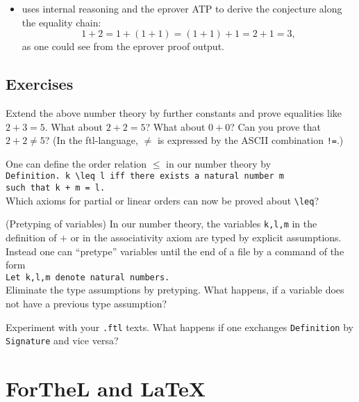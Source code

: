 \documentclass[11pt]{article}
\begin{document}
\begin{itemize}
\item \Naproche{} uses internal reasoning and the eprover ATP to
derive the conjecture
along the equality chain:
$$1 + 2 = 1 + (1 + 1) = (1 + 1) + 1 = 2 + 1 = 3,$$
as one could see from the eprover proof output.
\end{itemize}

\subsection{Exercises}

\begin{exercise}
Extend the above number theory by further constants and prove
equalities like $2 + 3 = 5$. What about $2 + 2 = 5$? What about
$0+0$? Can
you prove that $2 + 2 \neq 5$? (In the ftl-language, $\neq$ is expressed
by the ASCII combination \verb+!=+.)
\end{exercise}

\begin{exercise}
One can define the order relation $\leq$ in our number theory
by\\
\verb/Definition. k \leq l iff there exists a natural number m/\\
\verb/such that k + m = l./\\
Which axioms for partial or linear orders can now be proved about
\verb+\leq+?
\end{exercise}

\begin{exercise} (Pretyping of variables) In our number theory,
the variables \verb+k,l,m+ in the definition of $+$ or in the
associativity axiom are typed by explicit assumptions. Instead one
can ``pretype'' variables until the end of a file by a command of
the form\\
\verb+Let k,l,m denote natural numbers.+\\
Eliminate the type assumptions by pretyping.
What happens, if a variable does not have a previous
type assumption?
\end{exercise}

\begin{exercise} Experiment with your \verb+.ftl+ texts.
What happens if one exchanges \verb+Definition+ by
\verb+Signature+ and vice versa?
\end{exercise}

\section{ForTheL and \LaTeX}
\end{document}
